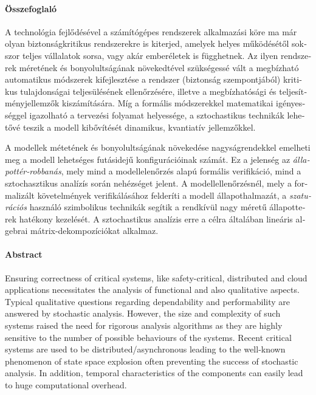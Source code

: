 \begin{otherlanguage}{magyar}

  \thispagestyle{plain}
  \paragraph*{Összefoglaló}

  A technológia fejlődésével a számítógépes rendszerek
  alkalmazási köre ma már olyan biztonságkritikus rendszerekre is
  kiterjed, amelyek helyes működésétől sokszor teljes vállalatok
  sorsa, vagy akár emberéletek is függhetnek. Az ilyen rendszerek
  méretének és bonyolultságának növekedtével szükségessé vált a
  megbízható automatikus módszerek kifejlesztése a rendszer (biztonság
  szempontjából) kritikus tulajdonságai teljesülésének ellenőrzésére,
  illetve a megbízhatósági és teljesítményjellemzők kiszámítására. Míg
  a formális módszerekkel matematikai igényességgel igazolható a
  tervezési folyamat helyessége, a sztochastikus technikák lehetővé
  teszik a modell kibővítését dinamikus, kvantiatív jellemzőkkel.

  A modellek métetének és bonyolultságának növekedése nagyságrendekkel
  emelheti meg a modell lehetséges futásidejű konfigurációinak
  számát. Ez a jelenség az \emph{állapottér-robbanás}, mely mind a
  modellelenőrzés alapú formális verifikáció, mind a sztochasztikus
  analízís során nehézséget jelent. A modellellenőrzésnél, mely a
  formalizált követelmények verifikálásához felderíti a modell
  állapothalmazát, a \emph{szaturációs} használó szimbolikus technikák
  segítik a rendkívül nagy méretű állapotterek hatékony kezelését. A
  sztochastikus analízis erre a célra általában lineáris algebrai
  mátrix-dekompozíciókat alkalmaz.

\end{otherlanguage}

\cleardoublepage

\thispagestyle{plain}
\paragraph*{Abstract}

Ensuring correctness of critical systems, like safety-critical,
distributed and cloud applications necessitates the analysis of
functional and also qualitative aspects. Typical qualitative questions
regarding dependability and performability are answered by stochastic
analysis. However, the size and complexity of such systems raised the need for
rigorous analysis algorithms as they are highly
sensitive to the number of possible behaviours of the systems. Recent
critical systems are used to be distributed/asynchronous leading to
the well-known phenomenon of state space explosion often preventing
the success of stochastic analysis. In addition, temporal
characteristics of the components can easily lead to huge
computational overhead.

